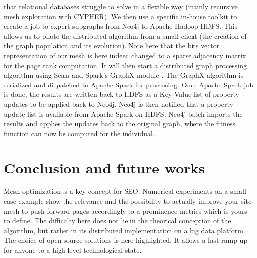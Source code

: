 \documentclass{iSWAGArticle}
\begin{document}
  that relational databases struggle to solve in a flexible way (mainly recursive mesh exploration with CYPHER). 
  We then use a specific in-house toolkit to create a job to export subgraphs from Neo4j to Apache Hadoop HDFS.
  This allows us to pilote the distributed algorithm from a small client (the creation of the graph population and its evolution). Note here that
  the bits vector representation of our mesh is here indeed changed to a sparse adjacency matrix for the page rank computation.
  It will then start a distributed graph processing algorithm using Scala \cite{scala} and Spark's GraphX module \cite{graphX}. 
  The GraphX algorithm is serialized and dispatched to Apache Spark for processing.
  Once Apache Spark job is done, the results are written back to HDFS as a Key-Value list of property updates to be applied back to Neo4j.
  Neo4j is then notified that a property update list is available from Apache Spark on HDFS. Neo4j batch imports the results and applies the updates back to the original graph,
  where the fitness function can now be computed for the individual.
  \section{Conclusion and future works}
  Mesh optimization is a key concept for SEO. Numerical experiments on a small case example show the relevance and the possibility to actually improve your site mesh
  to push forward pages accordingly to a prominence metrics which is yours to define. The difficulty here does not lie in the
  theorical conception of the algorithm, but rather in its distributed implementation on a big data platform. The choice of open source solutions
  is here highlighted. It allows a fast ramp-up for anyone to a high level technological state.
  \nocite{*}
  
  
  
\end{document}
